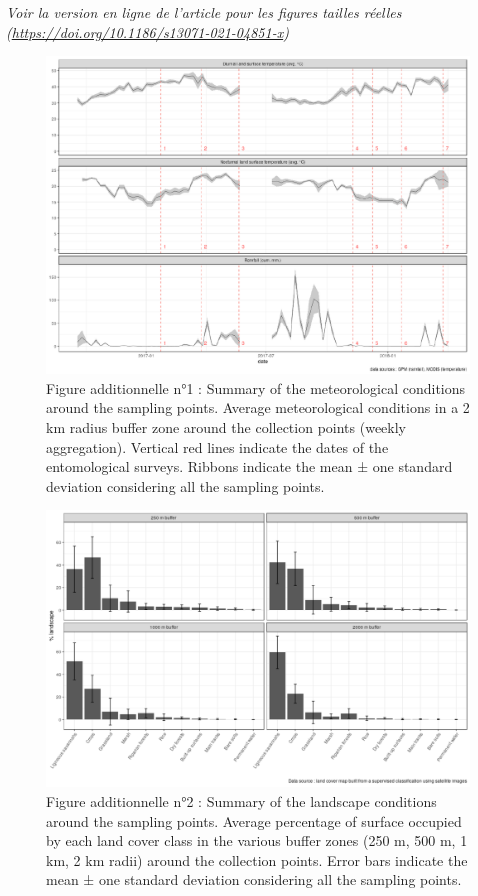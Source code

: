 \documentclass[12pt,twoside]{reedthesis}
\begin{document}
\emph{Voir la version en ligne de l'article pour les figures tailles réelles (\url{https://doi.org/10.1186/s13071-021-04851-x})}
\begin{figure}

{\centering \includegraphics[width=0.8\linewidth]{figure/add_file_1} 

}

\caption[Article n°1 - Figure additionnelle n°1]{Figure additionnelle n°1 : Summary of the meteorological conditions around the sampling points. Average meteorological conditions in a 2 km radius buffer zone around the collection points (weekly aggregation). Vertical red lines indicate the dates of the entomological surveys. Ribbons indicate the mean ± one standard deviation considering all the sampling points.}\label{fig:add-file-1}
\end{figure}
\begin{figure}

{\centering \includegraphics[width=0.8\linewidth]{figure/add_file_2} 

}

\caption[Article n°1 - Figure additionnelle n°2]{Figure additionnelle n°2 : Summary of the landscape conditions around the sampling points. Average percentage of surface occupied by each land cover class in the various buffer zones (250 m, 500 m, 1 km, 2 km radii) around the collection points. Error bars indicate the mean ± one standard deviation considering all the sampling points.}\label{fig:add-file-2}
\end{figure}
\end{document}
